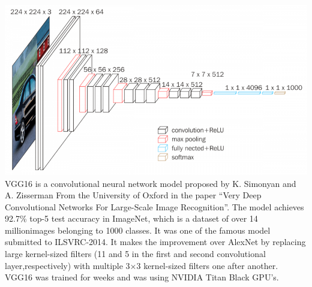 \includegraphics[scale=0.5]{images/modelOne/vgg16.png}
VGG16 is a convolutional neural network model proposed by K. Simonyan and A. Zisserman From the University of Oxford in the paper “Very Deep Convolutional Networks For Large-Scale Image Recognition”. The model achieves 92.7\%
top-5 test accuracy in ImageNet, which is a dataset of over 14 millionimages belonging to 1000 classes. It was one of the famous model submitted to ILSVRC-2014. It makes the improvement over AlexNet by replacing large kernel-sized filters (11 and 5 in the first and second convolutional layer,respectively) with multiple 3×3 kernel-sized filters one after another. VGG16 was trained for weeks and was using NVIDIA Titan Black GPU’s.
